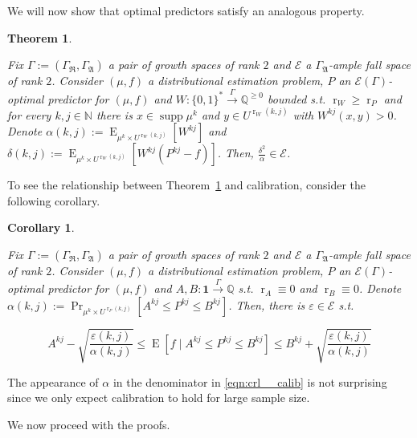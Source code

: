 \documentclass{article}
\numberwithin{equation}{section}
\theoremstyle{definition}
\theoremstyle{plain}
\newtheorem{theorem}{Theorem}[section]
\newtheorem{corollary}{Corollary}[section]
\newcommand{\Words}{{\{ 0, 1 \}^*}}
\DeclareMathOperator{\Supp}{supp}
\DeclareMathOperator{\Prb}{Pr}
\DeclareMathOperator{\E}{E}
\DeclareMathOperator{\R}{r}
\newcommand{\Nats}{\mathbb{N}}
\newcommand{\Rats}{\mathbb{Q}}
\newcommand{\GrowR}{\Gamma_{\mathfrak{R}}}
\newcommand{\GrowA}{\Gamma_{\mathfrak{A}}}
\newcommand{\Grow}{\Gamma:=(\GrowR,\GrowA)}
\newcommand{\Fall}{\mathcal{E}}
\newcommand{\Scheme}{\xrightarrow{\Gamma}}
\begin{document}
We will now show that optimal predictors satisfy an analogous property.

\begin{theorem}
\label{thm:calib}

Fix $\Grow$ a pair of growth spaces of rank $2$ and $\Fall$ a $\GrowA$-ample fall space of rank $2$. Consider $(\mu,f)$ a distributional estimation problem, $P$ an $\Fall(\Gamma)$-optimal predictor for $(\mu,f)$ and ${W: \Words \Scheme \Rats^{\geq 0}}$ bounded s.t. $\R_W \geq \R_P$ and for every $k,j \in \Nats$ there is $x \in \Supp \mu^k$ and $y \in U^{\R_W(k,j)}$ with $W^{kj}(x,y) > 0$. Denote ${\alpha(k,j):=\E_{\mu^k \times U^{\R_W(k,j)}}[W^{kj}]}$ and ${\delta(k,j):=\E_{\mu^k \times U^{\R_W(k,j)}}[W^{kj}(P^{kj}-f)]}$. Then, $\frac{\delta^2}{\alpha} \in \Fall$.

\end{theorem}

To see the relationship between Theorem~\ref{thm:calib} and calibration, consider the following corollary.

\begin{corollary}
\label{crl:calib}

Fix $\Grow$ a pair of growth spaces of rank $2$ and $\Fall$ a $\GrowA$-ample fall space of rank $2$. Consider $(\mu,f)$ a distributional estimation problem, $P$ an $\Fall(\Gamma)$-optimal predictor for $(\mu,f)$ and $A,B: \bm{1} \Scheme \Rats$ s.t. $\R_A \equiv 0$ and $\R_B \equiv 0$. Denote ${\alpha(k,j):=\Prb_{\mu^k \times U^{\R_P(k,j)}}[A^{kj} \leq P^{kj} \leq B^{kj}]}$. Then, there is $\varepsilon \in \Fall$ s.t. 

\begin{equation}
\label{eqn:crl__calib}
A^{kj} - \sqrt{\frac{\varepsilon(k,j)}{\alpha(k,j)}} \leq \E[f \mid A^{kj} \leq P^{kj} \leq B^{kj}] \leq B^{kj} + \sqrt{\frac{\varepsilon(k,j)}{\alpha(k,j)}}
\end{equation}

\end{corollary}

The appearance of $\alpha$ in the denominator in \ref{eqn:crl__calib} is not surprising since we only expect calibration to hold for large sample size.

We now proceed with the proofs.
\end{document}
